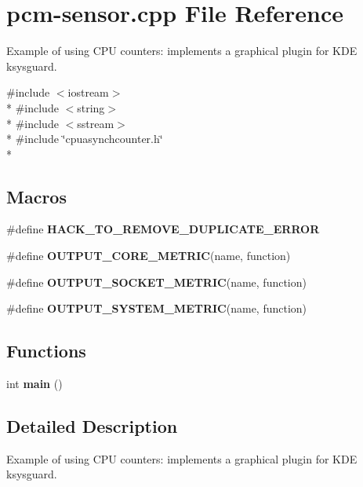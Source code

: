 \section{pcm-\/sensor.cpp File Reference}
\label{pcm-sensor_8cpp}


Example of using C\+P\+U counters\+: implements a graphical plugin for K\+D\+E ksysguard.  


{\ttfamily \#include $<$iostream$>$}\\*
{\ttfamily \#include $<$string$>$}\\*
{\ttfamily \#include $<$sstream$>$}\\*
{\ttfamily \#include \char`\"{}cpuasynchcounter.\+h\char`\"{}}\\*
\subsection*{Macros}
\begin{DoxyCompactItemize}
\item 
\#define {\bfseries H\+A\+C\+K\+\_\+\+T\+O\+\_\+\+R\+E\+M\+O\+V\+E\+\_\+\+D\+U\+P\+L\+I\+C\+A\+T\+E\+\_\+\+E\+R\+R\+O\+R}\label{pcm-sensor_8cpp_ac4eeb11d89b0f517835a12a04443ebe4}

\item 
\#define {\bfseries O\+U\+T\+P\+U\+T\+\_\+\+C\+O\+R\+E\+\_\+\+M\+E\+T\+R\+I\+C}(name,  function)
\item 
\#define {\bfseries O\+U\+T\+P\+U\+T\+\_\+\+S\+O\+C\+K\+E\+T\+\_\+\+M\+E\+T\+R\+I\+C}(name,  function)
\item 
\#define {\bfseries O\+U\+T\+P\+U\+T\+\_\+\+S\+Y\+S\+T\+E\+M\+\_\+\+M\+E\+T\+R\+I\+C}(name,  function)
\end{DoxyCompactItemize}
\subsection*{Functions}
\begin{DoxyCompactItemize}
\item 
int {\bfseries main} ()\label{pcm-sensor_8cpp_ae66f6b31b5ad750f1fe042a706a4e3d4}

\end{DoxyCompactItemize}


\subsection{Detailed Description}
Example of using C\+P\+U counters\+: implements a graphical plugin for K\+D\+E ksysguard. 



